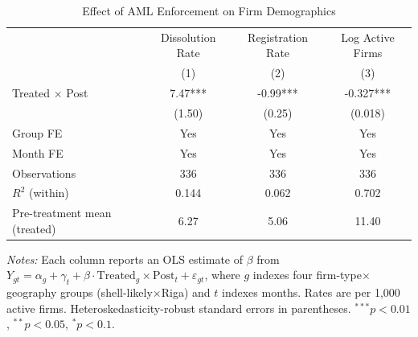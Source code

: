 \begin{table}[t]
\centering
\caption{Effect of AML Enforcement on Firm Demographics}
\label{tab:main_did}
\begin{tabular}{lccc}
\hline\hline
 & Dissolution Rate & Registration Rate & Log Active Firms \\
 & (1) & (2) & (3) \\
\hline
Treated $\times$ Post & 7.47*** & -0.99*** & -0.327*** \\
 & (1.50) & (0.25) & (0.018) \\
[6pt]
Group FE & Yes & Yes & Yes \\
Month FE & Yes & Yes & Yes \\
Observations & 336 & 336 & 336 \\
$R^2$ (within) & 0.144 & 0.062 & 0.702 \\
Pre-treatment mean (treated) & 6.27 & 5.06 & 11.40 \\
\hline\hline
\end{tabular}
\begin{tablenotes}[flushleft]
\small
\item \textit{Notes:} Each column reports an OLS estimate of $\beta$ from $Y_{gt} = \alpha_g + \gamma_t + \beta \cdot \text{Treated}_g \times \text{Post}_t + \varepsilon_{gt}$, where $g$ indexes four firm-type$\times$geography groups (shell-likely$\times$Riga) and $t$ indexes months. Rates are per 1,000 active firms. Heteroskedasticity-robust standard errors in parentheses. $^{***}p<0.01$, $^{**}p<0.05$, $^{*}p<0.1$.
\end{tablenotes}
\end{table}

